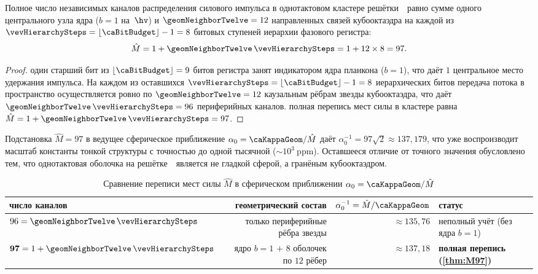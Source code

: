 \begin{theorem}[Полное число мест реестра кулоновской силы $\hat M = 97$]
\label{thm:M97}
Полное число независимых каналов распределения силового импульса в однотактовом кластере решётки~\latGCKshort\ равно сумме одного центрального узла ядра ($b=1$ на~$\hv$) и $\geomNeighborTwelve = 12$ направленных связей кубооктаэдра на каждой из $\vevHierarchySteps = \lfloor\caBitBudget\rfloor - 1 = 8$ битовых ступеней иерархии фазового регистра:
\[
  \hat M = 1 + \geomNeighborTwelve\,\vevHierarchySteps = 1 + 12\times 8 = 97.
\]
\end{theorem}

\begin{proof}
один старший бит из $\lfloor\caBitBudget\rfloor = 9$ битов регистра занят индикатором ядра планкона ($b=1$), что даёт $1$ центральное место удержания импульса.
На каждом из оставшихся $\vevHierarchySteps = \lfloor\caBitBudget\rfloor - 1 = 8$ иерархических битов передача потока в пространство осуществляется ровно по $\geomNeighborTwelve = 12$ каузальным рёбрам звезды кубооктаэдра, что даёт $\geomNeighborTwelve\,\vevHierarchySteps = 96$ периферийных каналов.
\pfollows
полная перепись мест силы в кластере равна $\hat M = 1 + \geomNeighborTwelve\,\vevHierarchySteps = 97$.
\end{proof}

Подстановка $\hat M = 97$ в ведущее сферическое приближение $\alpha_0 = \caKappaGeom/\hat M$ даёт $\alpha_0^{-1} = 97\sqrt{2} \approx 137{,}179$, что уже воспроизводит масштаб константы тонкой структуры с точностью до одной тысячной ($\sim 10^3\ \mathrm{ppm}$).
Оставшееся отличие от точного значения обусловлено тем, что однотактовая оболочка на решётке~\latGCKshort\ является не гладкой сферой, а гранёным кубооктаэдром.

\begin{table}[ht]
\centering
\caption{Сравнение переписи мест силы $\hat M$ в сферическом приближении $\alpha_0=\caKappaGeom/\hat M$}
\footnotesize
\setlength{\tabcolsep}{4pt}
\begin{tabular}{@{}lrrl@{}}
\toprule
число каналов & геометрический состав & $\alpha_0^{-1}=\hat M/\caKappaGeom$ & статус \\
\midrule
$96=\geomNeighborTwelve\,\vevHierarchySteps$ & только периферийные рёбра звезды & $\approx 135{,}76$ & неполный учёт (без ядра $b=1$) \\
$\mathbf{97}=1+\geomNeighborTwelve\,\vevHierarchySteps$ & ядро $b=1$ $+$ $8$ оболочек по $12$ рёбер & $\approx 137{,}18$ & \textbf{полная перепись (\cref{thm:M97})} \\
\bottomrule
\end{tabular}
\end{table}

